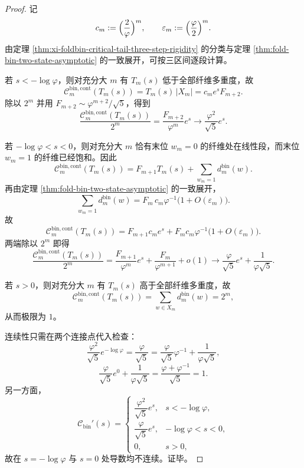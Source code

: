 \begin{proof}
记
\[
c_m:=\Bigl(\frac{2}{\varphi}\Bigr)^m,
\qquad
\varepsilon_m:=\Bigl(\frac{\varphi}{2}\Bigr)^m.
\]
由定理 \ref{thm:xi-foldbin-critical-tail-three-step-rigidity} 的分类与定理 \ref{thm:fold-bin-two-state-asymptotic} 的一致展开，可按三区间逐段计算。

若 \(s<-\log\varphi\)，则对充分大 \(m\) 有 \(T_m(s)\) 低于全部纤维多重度，故
\[
\mathcal C_m^{\mathrm{bin,cont}}(T_m(s))
=
T_m(s)\,|X_m|
=
c_m e^s F_{m+2}.
\]
除以 \(2^m\) 并用 \(F_{m+2}\sim \varphi^{m+2}/\sqrt5\)，得到
\[
\frac{\mathcal C_m^{\mathrm{bin,cont}}(T_m(s))}{2^m}
=
\frac{F_{m+2}}{\varphi^m}e^s
\longrightarrow
\frac{\varphi^2}{\sqrt5}e^s.
\]

若 \(-\log\varphi<s<0\)，则对充分大 \(m\) 恰有末位 \(w_m=0\) 的纤维处在线性段，而末位 \(w_m=1\) 的纤维已经饱和。因此
\[
\mathcal C_m^{\mathrm{bin,cont}}(T_m(s))
=
F_{m+1}T_m(s)+\sum_{w_m=1} d_m^{\mathrm{bin}}(w).
\]
再由定理 \ref{thm:fold-bin-two-state-asymptotic} 的一致展开，
\[
\sum_{w_m=1} d_m^{\mathrm{bin}}(w)
=
F_m\,c_m\varphi^{-1}\bigl(1+O(\varepsilon_m)\bigr).
\]
故
\[
\mathcal C_m^{\mathrm{bin,cont}}(T_m(s))
=
F_{m+1}c_m e^s+F_m c_m\varphi^{-1}\bigl(1+O(\varepsilon_m)\bigr).
\]
两端除以 \(2^m\) 即得
\[
\frac{\mathcal C_m^{\mathrm{bin,cont}}(T_m(s))}{2^m}
=
\frac{F_{m+1}}{\varphi^m}e^s+\frac{F_m}{\varphi^{m+1}}+o(1)
\longrightarrow
\frac{\varphi}{\sqrt5}e^s+\frac{1}{\varphi\sqrt5}.
\]

若 \(s>0\)，则对充分大 \(m\) 有 \(T_m(s)\) 高于全部纤维多重度，故
\[
\mathcal C_m^{\mathrm{bin,cont}}(T_m(s))
=
\sum_{w\in X_m} d_m^{\mathrm{bin}}(w)
=
2^m,
\]
从而极限为 \(1\)。

连续性只需在两个连接点代入检查：
\[
\frac{\varphi^2}{\sqrt5}e^{-\log\varphi}
=
\frac{\varphi}{\sqrt5}
=
\frac{\varphi}{\sqrt5}\varphi^{-1}+\frac{1}{\varphi\sqrt5},
\]
\[
\frac{\varphi}{\sqrt5}e^0+\frac{1}{\varphi\sqrt5}
=
\frac{\varphi+\varphi^{-1}}{\sqrt5}
=
1.
\]
另一方面，
\[
\mathcal C_{\mathrm{bin}}'(s)
=
\begin{cases}
\dfrac{\varphi^2}{\sqrt5}e^s, & s<-\log\varphi,\\[2mm]
\dfrac{\varphi}{\sqrt5}e^s, & -\log\varphi<s<0,\\[2mm]
0, & s>0,
\end{cases}
\]
故在 \(s=-\log\varphi\) 与 \(s=0\) 处导数均不连续。证毕。
\end{proof}


